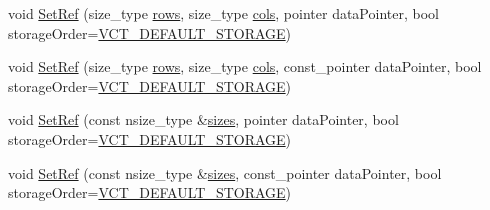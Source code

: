 {\bf }\par
\begin{DoxyCompactItemize}
\item 
void \hyperlink{classvct_dynamic_const_matrix_ref_ae05ea695c1eb51d2f8632fa6c2ce1e6e}{Set\-Ref} (size\-\_\-type \hyperlink{classvct_dynamic_const_matrix_base_a5eac13be2207ebeb8766cde379d73438}{rows}, size\-\_\-type \hyperlink{classvct_dynamic_const_matrix_base_aa6c51d41a100da49a7e7ac7edb20ecd9}{cols}, pointer data\-Pointer, bool storage\-Order=\hyperlink{vct_forward_declarations_8h_aacdb3b0140beef8a3c2025b808b74a73}{V\-C\-T\-\_\-\-D\-E\-F\-A\-U\-L\-T\-\_\-\-S\-T\-O\-R\-A\-G\-E})
\item 
void \hyperlink{classvct_dynamic_const_matrix_ref_a0afe73831f2a882072a2bdf370c22bea}{Set\-Ref} (size\-\_\-type \hyperlink{classvct_dynamic_const_matrix_base_a5eac13be2207ebeb8766cde379d73438}{rows}, size\-\_\-type \hyperlink{classvct_dynamic_const_matrix_base_aa6c51d41a100da49a7e7ac7edb20ecd9}{cols}, const\-\_\-pointer data\-Pointer, bool storage\-Order=\hyperlink{vct_forward_declarations_8h_aacdb3b0140beef8a3c2025b808b74a73}{V\-C\-T\-\_\-\-D\-E\-F\-A\-U\-L\-T\-\_\-\-S\-T\-O\-R\-A\-G\-E})
\item 
void \hyperlink{classvct_dynamic_const_matrix_ref_aa1caf7e102fffe86be3b3f806b9920bc}{Set\-Ref} (const nsize\-\_\-type \&\hyperlink{classvct_dynamic_const_matrix_base_ab8946f5d9d05321fcadf07f65dc314ce}{sizes}, pointer data\-Pointer, bool storage\-Order=\hyperlink{vct_forward_declarations_8h_aacdb3b0140beef8a3c2025b808b74a73}{V\-C\-T\-\_\-\-D\-E\-F\-A\-U\-L\-T\-\_\-\-S\-T\-O\-R\-A\-G\-E})
\item 
void \hyperlink{classvct_dynamic_const_matrix_ref_a3e48c5560436209a89858c031a6d1122}{Set\-Ref} (const nsize\-\_\-type \&\hyperlink{classvct_dynamic_const_matrix_base_ab8946f5d9d05321fcadf07f65dc314ce}{sizes}, const\-\_\-pointer data\-Pointer, bool storage\-Order=\hyperlink{vct_forward_declarations_8h_aacdb3b0140beef8a3c2025b808b74a73}{V\-C\-T\-\_\-\-D\-E\-F\-A\-U\-L\-T\-\_\-\-S\-T\-O\-R\-A\-G\-E})
\end{DoxyCompactItemize}

